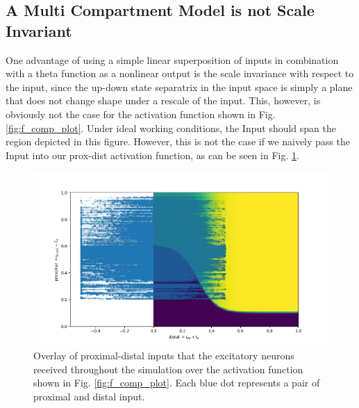 \documentclass[10pt,a4paper]{article}
\begin{document}
\subsection{A Multi Compartment Model is not Scale Invariant}

One advantage of using a simple linear superposition of inputs in combination with a theta function as a nonlinear output is the scale invariance with respect to the input, since the up-down state separatrix in the input space is simply a plane that does not change shape under a rescale of the input. This, however, is obviously not the case for the activation function shown in Fig. \ref{fig:f_comp_plot}. Under ideal working conditions, the Input should span the region depicted in this figure. However, this is not the case if we naively pass the Input into our prox-dist activation function, as can be seen in Fig. \ref{fig:prox_dist_act_cloud}.

\begin{figure}
\includegraphics[width=\textwidth]{../../plots/prox_dist_act_cloud.png}
\caption{\label{fig:prox_dist_act_cloud} Overlay of proximal-distal inputs that the excitatory neurons received throughout the simulation over the activation function shown in Fig. \ref{fig:f_comp_plot}. Each blue dot represents a pair of proximal and distal input.}
\end{figure}
\end{document}
